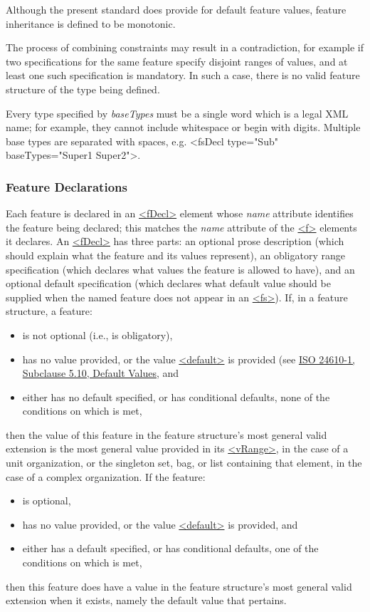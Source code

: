 Although the present standard does provide for default feature values, feature inheritance is defined to be monotonic. \par
The process of combining constraints may result in a contradiction, for example if two specifications for the same feature specify disjoint ranges of values, and at least one such specification is mandatory. In such a case, there is no valid feature structure of the type being defined.\par
Every type specified by {\itshape baseTypes} must be a single word which is a legal XML name; for example, they cannot include whitespace or begin with digits. Multiple base types are separated with spaces, e.g. <fsDecl type="Sub" baseTypes="Super1 Super2">.
\subsubsection[{Feature Declarations}]{Feature Declarations}\label{FDFD}\par
Each feature is declared in an \hyperref[TEI.fDecl]{<fDecl>} element whose {\itshape name} attribute identifies the feature being declared; this matches the {\itshape name} attribute of the \hyperref[TEI.f]{<f>} elements it declares.  An \hyperref[TEI.fDecl]{<fDecl>} has three parts: an optional prose description (which should explain what the feature and its values represent), an obligatory range specification (which declares what values the feature is allowed to have), and an optional default specification (which declares what default value should be supplied when the named feature does not appear in an \hyperref[TEI.fs]{<fs>}). If, in a feature structure, a feature: \begin{itemize}
\item is not optional (i.e., is obligatory),
\item has no value provided, or the value \hyperref[TEI.default]{<default>} is provided (see \hyperref[FSBO]{ISO 24610-1, Subclause 5.10, Default Values}, and
\item either has no default specified, or has conditional defaults, none of the conditions on which is met,
\end{itemize}  then the value of this feature in the feature structure's most general valid extension is the most general value provided in its \hyperref[TEI.vRange]{<vRange>}, in the case of a unit organization, or the singleton set, bag, or list containing that element, in the case of a complex organization. If the feature: \begin{itemize}
\item is optional,
\item has no value provided, or the value \hyperref[TEI.default]{<default>} is provided, and
\item either has a default specified, or has conditional defaults, one of the conditions on which is met,
\end{itemize}  then this feature does have a value in the feature structure's most general valid extension when it exists, namely the default value that pertains.\par
